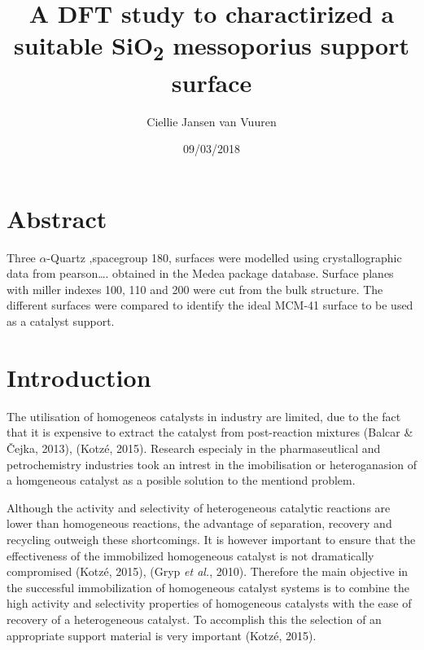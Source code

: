 \documentclass[]{article}
\title{A DFT study to charactirized a suitable SiO\textsubscript{2} messoporius
support surface}
\author{Ciellie Jansen van Vuuren}
\date{09/03/2018}
\let\oldsubparagraph\subparagraph
\renewcommand{\subparagraph}[1]{\oldsubparagraph{#1}\mbox{}}
\begin{document}
\maketitle

\hypertarget{section}{%
\subparagraph{}\label{section}}

\hypertarget{abstract}{%
\section{Abstract}\label{abstract}}

Three \(\alpha\)-Quartz ,spacegroup 180, surfaces were modelled using
crystallographic data from pearson\ldots{}. obtained in the Medea
package database. Surface planes with miller indexes 100, 110 and 200
were cut from the bulk structure. The different surfaces were compared
to identify the ideal MCM-41 surface to be used as a catalyst support.

\hypertarget{introduction}{%
\section{Introduction}\label{introduction}}

The utilisation of homogeneos catalysts in industry are limited, due to
the fact that it is expensive to extract the catalyst from post-reaction
mixtures (Balcar \& Čejka, 2013), (Kotzé, 2015). Research especialy in
the pharmaseutlical and petrochemistry industries took an intrest in the
imobilisation or heteroganasion of a homgeneous catalyst as a posible
solution to the mentiond problem.

Although the activity and selectivity of heterogeneous catalytic
reactions are lower than homogeneous reactions, the advantage of
separation, recovery and recycling outweigh these shortcomings. It is
however important to ensure that the effectiveness of the immobilized
homogeneous catalyst is not dramatically compromised (Kotzé, 2015),
(Gryp \emph{et al.}, 2010). Therefore the main objective in the
successful immobilization of homogeneous catalyst systems is to combine
the high activity and selectivity properties of homogeneous catalysts
with the ease of recovery of a heterogeneous catalyst. To accomplish
this the selection of an appropriate support material is very important
(Kotzé, 2015).
\end{document}
